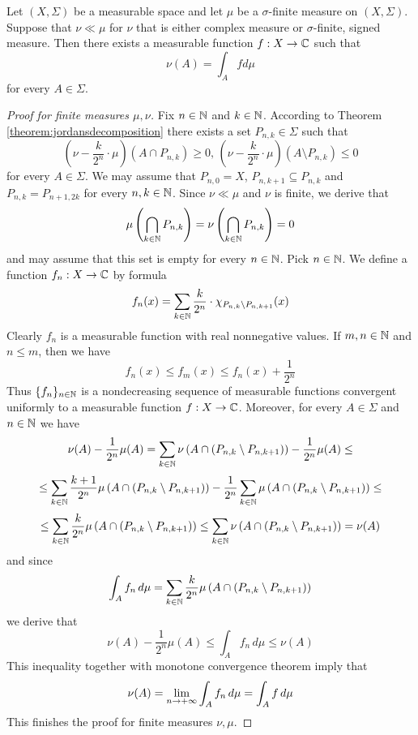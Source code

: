 \begin{theorem}\label{theorem:radonnikodymmain}
Let $(X,\Sigma)$ be a measurable space and let $\mu$ be a $\sigma$-finite measure on $(X,\Sigma)$. Suppose that $\nu \ll \mu$ for $\nu$ that is either complex measure or $\sigma$-finite, signed measure. Then there exists a measurable function $f:X\rightarrow {\mathbb C}$ such that
$$\nu(A) = \int_A f d\mu$$
for every $A\in \Sigma$.
\end{theorem}
\begin{proof}[Proof for finite measures $\mu,\nu$]
Fix $n\in {\mathbb N}$ and $k\in {\mathbb N}$. According to Theorem \ref{theorem:jordansdecomposition} there exists a set $P_{n,k}\in \Sigma$ such that
$$\left(\nu - \frac{k}{2^n}\cdot \mu\right)\left(A\cap P_{n,k}\right)\geq 0,\,\left(\nu - \frac{k}{2^n}\cdot \mu\right)\left(A\setminus P_{n,k}\right)\leq 0$$
for every $A\in \Sigma$. We may assume that $P_{n,0}=X$, $P_{n,k+1}\subseteq P_{n,k}$ and $P_{n,k} =P_{n+1,2k}$ for every $n, k\in {\mathbb N}$. Since $\nu \ll \mu$ and $\nu$ is finite, we derive that
$$\mu\left(\bigcap_{k\in {\mathbb N}}P_{n,k}\right) = \nu\left(\bigcap_{k\in {\mathbb N}}P_{n,k}\right)=0$$
and may assume that this set is empty for every $n\in {\mathbb N}$. Pick $n\in {\mathbb N}$. We define a function $f_n:X\rightarrow {\mathbb C}$ by formula
$$f_n(x) =\sum_{k\in {\mathbb N}} \frac{k}{2^n}\cdot \chi_{P_{n,k}\setminus P_{n,k+1}}(x)$$
Clearly $f_n$ is a measurable function with real nonnegative values. If $m,n\in {\mathbb N}$ and $n\leq m$, then we have
$$f_n(x)\leq f_m(x)\leq f_n(x)+\frac{1}{2^n}$$
Thus $\{f_n\}_{n\in {\mathbb N}}$ is a nondecreasing sequence of measurable functions convergent uniformly to a measurable function $f:X\rightarrow {\mathbb C}$. Moreover, for every $A\in \Sigma$ and $n\in {\mathbb N}$ we have
$$\nu(A)-\frac{1}{2^n}\mu(A) = \sum_{k\in {\mathbb N}}\nu\left(A\cap \left(P_{n,k}\setminus P_{n,k+1}\right)\right)-\frac{1}{2^n}\mu(A)  \leq$$
$$\leq \sum_{k\in {\mathbb N}}\frac{k+1}{2^n}\mu\left(A\cap \left(P_{n,k}\setminus P_{n,k+1}\right)\right) - \frac{1}{2^n}\sum_{k\in {\mathbb N}}\mu\left(A\cap \left(P_{n,k}\setminus P_{n,k+1}\right)\right) \leq  $$
$$\leq  \sum_{k\in {\mathbb N}}\frac{k}{2^n}\mu\left(A\cap \left(P_{n,k}\setminus P_{n,k+1}\right)\right)\leq \sum_{k\in {\mathbb N}}\nu\left(A\cap \left(P_{n,k}\setminus P_{n,k+1}\right)\right) = \nu(A)$$
and since
$$\int_Af_n\,d\mu =  \sum_{k\in {\mathbb N}}\frac{k}{2^n}\mu\left(A\cap \left(P_{n,k}\setminus P_{n,k+1}\right)\right)$$
we derive that
$$\nu(A)-\frac{1}{2^n}\mu(A) \leq \int_Af_n\,d\mu \leq \nu(A)$$
This inequality together with monotone convergence theorem imply that
$$\nu(A) =  \lim_{n\rightarrow +\infty}\int_Af_n\,d\mu = \int_Af\,d\mu$$
This finishes the proof for finite measures $\nu,\mu$.
\end{proof}

